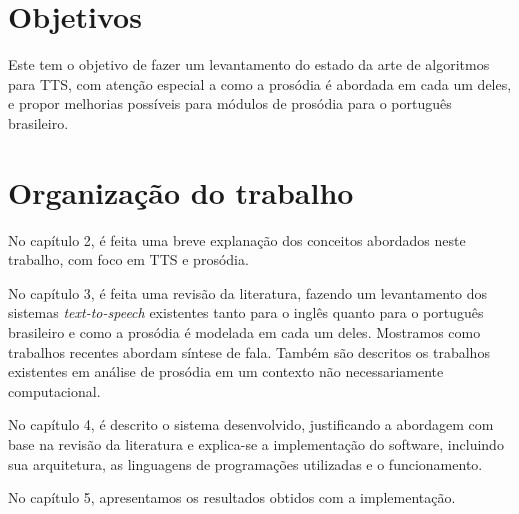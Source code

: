 \section{Objetivos}
Este tem o objetivo de fazer um levantamento do estado da arte de algoritmos
para TTS, com atenção especial a como a prosódia é abordada em cada um deles, e
propor melhorias possíveis para módulos de prosódia para o português brasileiro.

\section{Organização do trabalho}

No capítulo 2, é feita uma breve explanação dos conceitos abordados neste
trabalho, com foco em TTS e prosódia.


No capítulo 3, é feita uma revisão da literatura, fazendo um levantamento dos
sistemas \emph{text-to-speech} existentes tanto para o inglês quanto para o
português brasileiro e como a prosódia é modelada em cada um deles. Mostramos
como trabalhos recentes abordam síntese de fala. Também são descritos os
trabalhos existentes em análise de prosódia em um contexto não necessariamente
computacional.

No capítulo 4, é descrito o sistema desenvolvido, justificando a abordagem com
base na revisão da literatura e explica-se a implementação do software,
incluindo sua arquitetura, as linguagens de programações utilizadas e o
funcionamento.

No capítulo 5,
apresentamos os resultados obtidos com a implementação.